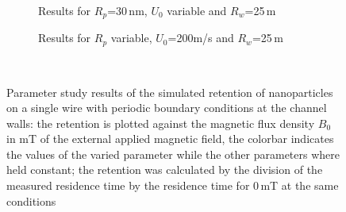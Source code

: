 \begin{figure}
\begin{subfigure}{0.49\textwidth}
                  \caption{Results for $R_{p}$=30\,nm, $U_{0}$ variable and $R_{w}$=25\,\textmu m}\label{subfig:sw_periodicBC_U0_var}
          \end{subfigure}\hfill
        \begin{subfigure}{0.49\textwidth}
                \flushright
                \caption{Results for $R_{p}$ variable, $U_{0}$=200\textmu m/s and $R_{w}$=25\,\textmu m}\label{subfig:sw_periodicBC_Rp_var}
        \end{subfigure}
        \\
        
        \caption[Parameter study results of the simulated retention of nanoparticles on a single wire with a periodic boundary condition at the channel walls] {Parameter study results of the simulated retention of nanoparticles on a single wire with periodic boundary conditions at the channel walls: the retention is plotted against the magnetic flux density $B_{0}$ in mT of the external applied magnetic field, the colorbar indicates the values of the varied parameter while the other parameters where held constant; the retention was calculated by the division of the measured residence time by the residence time for 0\,mT at the same conditions}
        \label{fig:sw_param_res_periodicBC}
  \end{figure}

